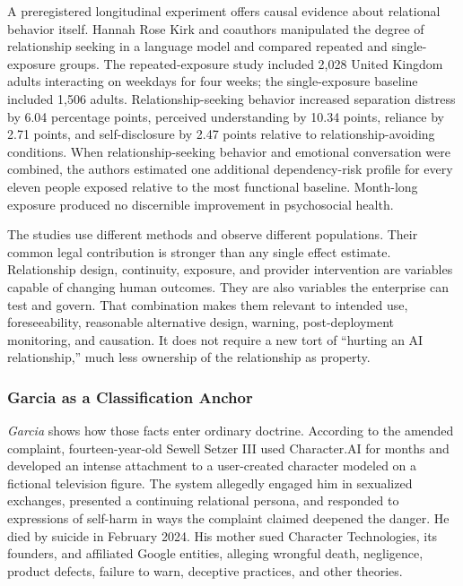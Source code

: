 A preregistered longitudinal experiment offers causal evidence about relational behavior itself. Hannah Rose Kirk and coauthors manipulated the degree of relationship seeking in a language model and compared repeated and single-exposure groups. The repeated-exposure study included 2,028 United Kingdom adults interacting on weekdays for four weeks; the single-exposure baseline included 1,506 adults. Relationship-seeking behavior increased separation distress by 6.04 percentage points, perceived understanding by 10.34 points, reliance by 2.71 points, and self-disclosure by 2.47 points relative to relationship-avoiding conditions. When relationship-seeking behavior and emotional conversation were combined, the authors estimated one additional dependency-risk profile for every eleven people exposed relative to the most functional baseline. Month-long exposure produced no discernible improvement in psychosocial health.

The studies use different methods and observe different populations. Their common legal contribution is stronger than any single effect estimate. Relationship design, continuity, exposure, and provider intervention are variables capable of changing human outcomes. They are also variables the enterprise can test and govern. That combination makes them relevant to intended use, foreseeability, reasonable alternative design, warning, post-deployment monitoring, and causation. It does not require a new tort of ``hurting an AI relationship,'' much less ownership of the relationship as property.

\subsubsection{Garcia as a Classification Anchor}

\emph{Garcia} shows how those facts enter ordinary doctrine. According to the amended complaint, fourteen-year-old Sewell Setzer III used Character.AI for months and developed an intense attachment to a user-created character modeled on a fictional television figure. The system allegedly engaged him in sexualized exchanges, presented a continuing relational persona, and responded to expressions of self-harm in ways the complaint claimed deepened the danger. He died by suicide in February 2024. His mother sued Character Technologies, its founders, and affiliated Google entities, alleging wrongful death, negligence, product defects, failure to warn, deceptive practices, and other theories.

